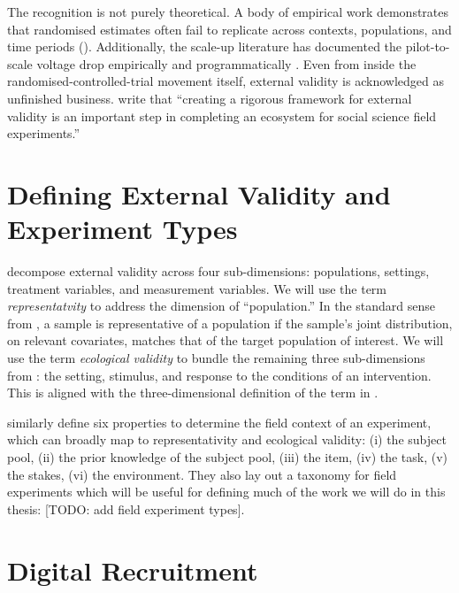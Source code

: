 The recognition is not purely theoretical. A body of empirical work demonstrates that randomised estimates often fail to replicate across contexts, populations, and time periods (\cite{Pritchett2016, Allcott2015, Bisbee2017, Rosenzweig2019}). Additionally, the scale-up literature has documented the pilot-to-scale voltage drop empirically \citep{Bold2018} and programmatically \citep{Muralidharan2017,Al-Ubaydli2020}. Even from inside the randomised-controlled-trial movement itself, external validity is acknowledged as unfinished business. \citet{Snowberg2016} write that ``creating a rigorous framework for external validity is an important step in completing an ecosystem for social science field experiments.'' 




\section{Defining External Validity and Experiment Types}
\label{sec:intro:definitions}

\citet{CampbellStanley1963} decompose external validity across four sub-dimensions: populations, settings, treatment variables, and measurement variables. We will use the term \emph{representatvity} to address the dimension of ``population.'' In the standard sense from \citet{Neyman1934}, a sample is representative of a population if the sample's joint distribution, on relevant covariates, matches that of the target population of interest. We will use the term \emph{ecological validity} to bundle the remaining three sub-dimensions from \citet{CampbellStanley1963}: the setting, stimulus, and response to the conditions of an intervention. This is aligned with the three-dimensional definition of the term in \citet{Schmuckler2001}.

\citet{Harrison2004} similarly define six properties to determine the field context of an experiment, which can broadly map to representativity and ecological validity: (i) the subject pool, (ii) the prior knowledge of the subject pool, (iii) the item, (iv) the task, (v) the stakes, (vi) the environment. They also lay out a taxonomy for field experiments which will be useful for defining much of the work we will do in this thesis: [TODO: add field experiment types]. 

\section{Digital Recruitment}
\label{sec:intro:definitions}

